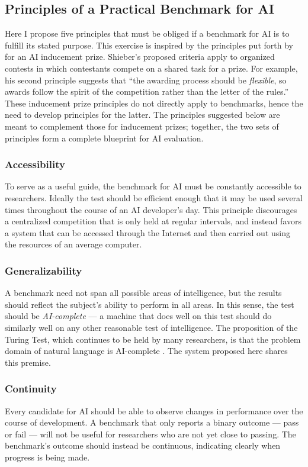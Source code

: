 \subsection{Principles of a Practical Benchmark for AI}

Here I propose five principles that must be obliged if a benchmark for AI is to fulfill its stated purpose. This exercise is inspired by the principles put forth by \citet{shieber2015} for an AI inducement prize. Shieber's proposed criteria apply to organized contests in which contestants compete on a shared task for a prize. For example, his second principle suggests that ``the awarding process should be \textit{flexible}, so awards follow the spirit of the competition rather than the letter of the rules.'' These inducement prize principles do not directly apply to benchmarks, hence the need to develop principles for the latter. The principles suggested below are meant to complement those for inducement prizes; together, the two sets of principles form a complete blueprint for AI evaluation.

\subsubsection{Accessibility}
To serve as a useful guide, the benchmark for AI must be constantly accessible to researchers. Ideally the test should be efficient enough that it may be used several times throughout the course of an AI developer's day. This principle discourages a centralized competition that is only held at regular intervals, and instead favors a system that can be accessed through the Internet and then carried out using the resources of an average computer.

\subsubsection{Generalizability}
A benchmark need not span all possible areas of intelligence, but the results should reflect the subject's ability to perform in all areas. In this sense, the test should be \textit{AI-complete} --- a machine that does well on this test should do similarly well on any other reasonable test of intelligence. The proposition of the Turing Test, which continues to be held by many researchers, is that the problem domain of natural language is AI-complete \citep{yampolskiy2013turing, weston2015towards}. The system proposed here shares this premise.

\subsubsection{Continuity}
Every candidate for AI should be able to observe changes in performance over the course of development. A benchmark that only reports a binary outcome --- pass or fail --- will not be useful for researchers who are not yet close to passing. The benchmark's outcome should instead be continuous, indicating clearly when progress is being made.


